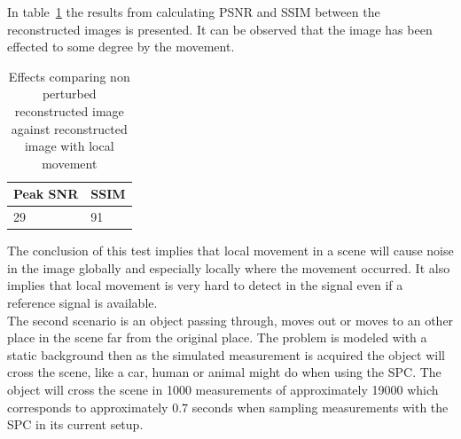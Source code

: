 In table~\ref{tab:local_dyn} the results from calculating PSNR and SSIM between the reconstructed images is presented. It can be observed that the image has been effected to some degree by the movement.

\begin{table}[H]
    \centering
  \begin{tabular}{ | l | l |}
    \hline
    Peak SNR  & SSIM \\ \hline
    29  & 91 \\ 
    \hline
  \end{tabular}
      \caption{Effects comparing non perturbed reconstructed image against reconstructed image with local movement}
    \label{tab:local_dyn}
\end{table}


The conclusion of this test implies that local movement in a scene will cause noise in the image globally and especially locally where the movement occurred. It also implies that local movement is very hard to detect in the signal even if a reference signal is available.\\[0.1in] 




The second scenario is an object passing through, moves out or moves to an other place in the scene far from the original place. The problem is modeled with a static background then as the simulated measurement is acquired the object will cross the scene, like a car, human or animal might do when using the SPC. The object will cross the scene in 1000 measurements of approximately 19000 which corresponds to approximately $0.7$ seconds when sampling measurements with the SPC in its current setup.\\[0.1in]



